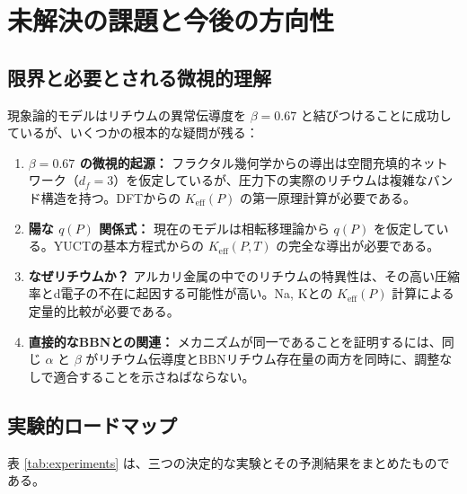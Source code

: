 \documentclass[11pt,a4paper]{article}
\newcommand{\Ke}{K_{\mathrm{eff}}}
\newcommand{\df}{d_{\!f}}
\newcommand{\alp}{\alpha}
\theoremstyle{remark}
\begin{document}
	\section{未解決の課題と今後の方向性}
	\label{sec:open-questions}
	
	\subsection{限界と必要とされる微視的理解}
	
	現象論的モデルはリチウムの異常伝導度を \(\beta = 0.67\) と結びつけることに成功しているが、いくつかの根本的な疑問が残る：
	
	\begin{enumerate}
		\item \textbf{\(\beta = 0.67\) の微視的起源：} フラクタル幾何学からの導出は空間充填的ネットワーク（\(\df = 3\)）を仮定しているが、圧力下の実際のリチウムは複雑なバンド構造を持つ。DFTからの \(\Ke(P)\) の第一原理計算が必要である。
		\item \textbf{陽な \(q(P)\) 関係式：} 現在のモデルは相転移理論から \(q(P)\) を仮定している。YUCTの基本方程式からの \(\Ke(P,T)\) の完全な導出が必要である。
		\item \textbf{なぜリチウムか？} アルカリ金属の中でのリチウムの特異性は、その高い圧縮率とd電子の不在に起因する可能性が高い。Na, Kとの \(\Ke(P)\) 計算による定量的比較が必要である。
		\item \textbf{直接的なBBNとの関連：} メカニズムが同一であることを証明するには、同じ \(\alp\) と \(\beta\) がリチウム伝導度とBBNリチウム存在量の両方を同時に、調整なしで適合することを示さねばならない。
	\end{enumerate}
	
	\subsection{実験的ロードマップ}
	
	表 \ref{tab:experiments} は、三つの決定的な実験とその予測結果をまとめたものである。
	
\end{document}
